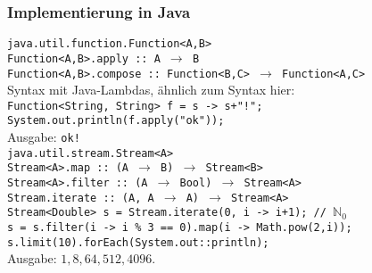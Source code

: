 \documentclass{beamer}
\begin{document}
    \begin{frame}[t]
        \frametitle{Implementierung in Java}
        {\scriptsize
            \texttt{java.util.function.Function<A,B>}\\
            \texttt{Function<A,B>.apply ::\ A $\to$ B}\\
            \texttt{Function<A,B>.compose :: Function<B,C> $\to$ Function<A,C>}\\[10pt]
            \pause
            Syntax mit Java-Lambdas, ähnlich zum Syntax hier:\\[5pt]
            \texttt{Function<String, String> f = s -> s+"!";}\\
            \texttt{System.out.println(f.apply("ok"));}\\[5pt]
            Ausgabe: \texttt{ok!}\\[10pt]
            \pause
            \texttt{java.util.stream.Stream<A>}\\
            \texttt{Stream<A>.map ::\ (A $\to$ B) $\to$ Stream<B>}\\\pause
            \texttt{Stream<A>.filter ::\ (A $\to$ Bool) $\to$ Stream<A>}\\\pause
            \texttt{Stream.iterate ::\ (A, A $\to$ A) $\to$ Stream<A>}\\[10pt]

            \texttt{Stream<Double> s = Stream.iterate(0, i -> i+1); // $\mathbb{N}_0$}\\
            \texttt{s = s.filter(i -> i \% 3 == 0).map(i -> Math.pow(2,i));}\\
            \texttt{s.limit(10).forEach(System.out::println);}\\[5pt]
            Ausgabe: $1, 8, 64, 512, 4096$.
        }
    \end{frame}
\end{document}
